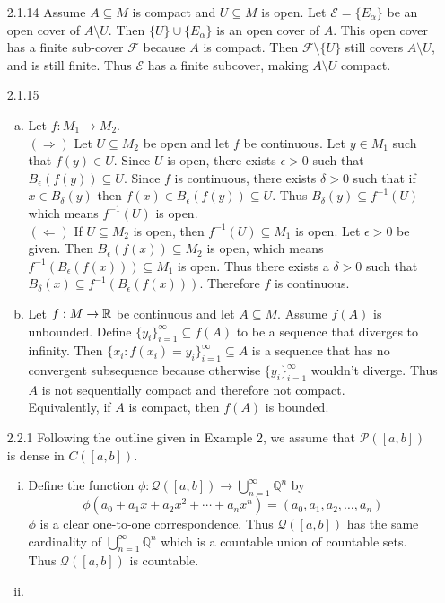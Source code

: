 \documentclass[../../Solutions.tex]{subfiles}
\begin{document}
\begin{itemize}
	\item [2.1.14] Assume $A \subseteq M$ is compact and $U \subseteq M$ is open.
		Let $\mathcal{E} = \{E_\alpha\}$ be an open cover of $A \setminus U$.
		Then $\{U\} \cup \{E_\alpha\}$ is an open cover of $A$.
		This open cover has a finite sub-cover $\mathcal{F}$ because $A$ is compact.
		Then $\mathcal{F} \setminus \{U\}$ still covers $A \setminus U$, and is still finite.
		Thus $\mathcal{E}$ has a finite subcover, making $A \setminus U$ compact.
		
	\item [2.1.15]
	\begin{enumerate}[(a)]
		\item Let $f:M_1 \to M_2$. \\
			$(\Rightarrow)$ Let $U \subseteq M_2$ be open and let $f$ be continuous.
			Let $y \in M_1$ such that $f(y) \in U$.
			Since $U$ is open, there exists $\epsilon > 0$ such that $B_\epsilon(f(y)) \subseteq U$.
			Since $f$ is continuous, there exists $\delta > 0$ such that if $x \in B_\delta(y)$ then $f(x) \in B_\epsilon(f(y)) \subseteq U$.
			Thus $B_\delta(y) \subseteq f^{-1}(U)$ which means $f^{-1}(U)$ is open. \\
			$(\Leftarrow)$ If $U \subseteq M_2$ is open, then $f^{-1}(U) \subseteq M_1$ is open.
			Let $\epsilon > 0$ be given.
			Then $B_\epsilon(f(x)) \subseteq M_2$ is open, which means $f^{-1}(B_\epsilon(f(x))) \subseteq M_1$ is open.
			Thus there exists a $\delta > 0$ such that $B_\delta(x) \subseteq f^{-1}(B_\epsilon(f(x)))$.
			Therefore $f$ is continuous.
		\item Let $f:M \to \mathbb{R}$ be continuous and let $A \subseteq M$.
			Assume $f(A)$ is unbounded.
			Define $\{y_i\}_{i=1}^\infty \subseteq f(A)$ to be a sequence that diverges to infinity.
			Then $\{x_i:f(x_i) = y_i\}_{i=1}^\infty \subseteq A$ is a sequence that has no convergent subsequence because otherwise $\{y_i\}_{i=1}^\infty$ wouldn't diverge.
			Thus $A$ is not sequentially compact and therefore not compact. \\
			Equivalently, if $A$ is compact, then $f(A)$ is bounded.
	\end{enumerate}
	
	\item [2.2.1] Following the outline given in Example 2, we assume that $\mathcal{P}([a,b])$ is dense in $C([a,b])$.
	\begin{enumerate}[(i)]
		\item Define the function $\phi : \mathcal{Q}([a,b]) \to \bigcup_{n=1}^\infty \mathbb{Q}^n$ by
			$$ \phi(a_0+a_1x+a_2x^2+\cdots + a_nx^n) = (a_0,a_1,a_2,\dots,a_n) $$
			$\phi$ is a clear one-to-one correspondence.
			Thus $\mathcal{Q}([a,b])$ has the same cardinality of $\bigcup_{n=1}^\infty \mathbb{Q}^n$ which is a countable union of countable sets.
			Thus $\mathcal{Q}([a,b])$ is countable.
		\item 
	\end{enumerate}
	
\end{itemize}
\end{document}
